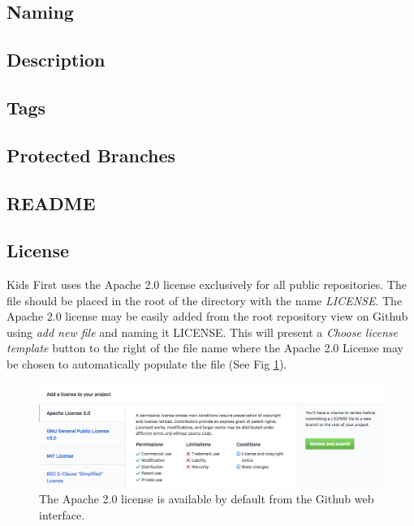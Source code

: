 \documentclass[a4paper,12pt,titlepage]{scrartcl}
\begin{document}
	\subsection{Naming}
	
	\subsection{Description}
	
	\subsection{Tags}
	
	\subsection{Protected Branches}
	
	\subsection{README}
	
	\subsection{License}
	
	Kids First uses the Apache 2.0 \cite{apache2} license exclusively for all public repositories.
	The file should be placed in the root of the directory with the name {\em LICENSE}.
	The Apache 2.0 license may be easily added from the root repository view on Github using {\em add new file} and naming it LICENSE.
	This will present a {\em Choose license template} button to the right of the file name where the Apache 2.0 License may be chosen to automatically populate the file (See Fig \ref{fig:addlicense}).
	
	\begin{figure}
    		\centering
    		\includegraphics[width=0.8\linewidth]{images/license.png}
    		\caption{The Apache 2.0 license is available by default from the Github web interface.}
    		\label{fig:addlicense}
    \end{figure}
	
\end{document}
